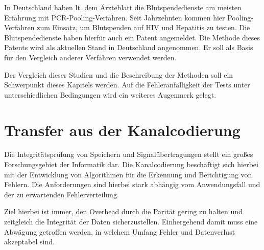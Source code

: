 In Deutschland haben lt. dem Ärzteblatt die Blutspendedienste am meisten Erfahrung mit PCR-Pooling-Verfahren.
\cite{Ärzteblatt}
Seit Jahrzehnten kommen hier Pooling-Verfahren zum Einsatz, um Blutspenden auf HIV und Hepatitis zu testen.
Die Blutspendedienste haben hierfür auch ein Patent angemeldet.
\cite{Patent Blutspende}
Die Methode dieses Patents wird als aktuellen Stand in Deutschland angenommen.
Er soll als Basis für den Vergleich anderer Verfahren verwendet werden.

Der Vergleich dieser Studien und die Beschreibung der Methoden soll ein Schwerpunkt dieses Kapitels werden.
Auf die Fehleranfälligkeit der Tests unter unterschiedlichen Bedingungen wird ein weiteres Augenmerk gelegt.

\section{Transfer aus der Kanalcodierung}
Die Integritätsprüfung von Speichern und Signalübertragungen stellt ein großes Forschungsgebiet der Informatik dar.
Die Kanalcodierung beschäftigt sich hierbei mit der Entwicklung von Algorithmen für die Erkennung und Berichtigung von Fehlern.
Die Anforderungen sind hierbei stark abhängig vom Anwendungsfall und der zu erwartenden Fehlerverteilung.

Ziel hierbei ist immer, den Overhead durch die Parität gering zu halten und zeitgleich die Integrität der Daten sicherzustellen.
Einhergehend damit muss eine Abwägung getroffen werden, in welchem Umfang Fehler und Datenverlust akzeptabel sind.

